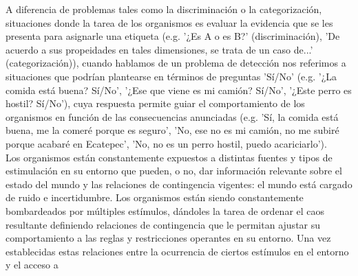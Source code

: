 A diferencia de problemas tales como la discriminación o la categorización, situaciones donde la tarea de los organismos es evaluar la evidencia que se les presenta para asignarle una etiqueta (e.g. '¿Es A o es B?' (discriminación), 'De acuerdo a sus propeidades en tales dimensiones, se trata de un caso de...' (categorización)), cuando hablamos de un problema de detección nos referimos a situaciones que podrían plantearse en términos de preguntas 'Sí/No' (e.g. '¿La comida está buena? Sí/No', '¿Ese que viene es mi camión? Sí/No', '¿Este perro es hostil? Sí/No'), cuya respuesta permite guiar el comportamiento de los organismos en función de las consecuencias anunciadas (e.g. 'Sí, la comida está buena, me la comeré porque es seguro', 'No, ese no es mi camión, no me subiré porque acabaré en Ecatepec', 'No, no es un perro hostil, puedo acariciarlo').\\ 

Los organismos están constantemente expuestos a distintas fuentes y tipos de estimulación en su entorno que pueden, o no, dar información relevante sobre el estado del mundo y las relaciones de contingencia vigentes: el mundo está cargado de ruido e incertidumbre. Los organismos están siendo constantemente bombardeados por múltiples estímulos, dándoles la tarea de ordenar el caos resultante definiendo relaciones de contingencia que le permitan ajustar su comportamiento a las reglas y restricciones operantes en su entorno. Una vez establecidas estas relaciones entre la ocurrencia de ciertos estímulos en el entorno y el acceso a  \\

